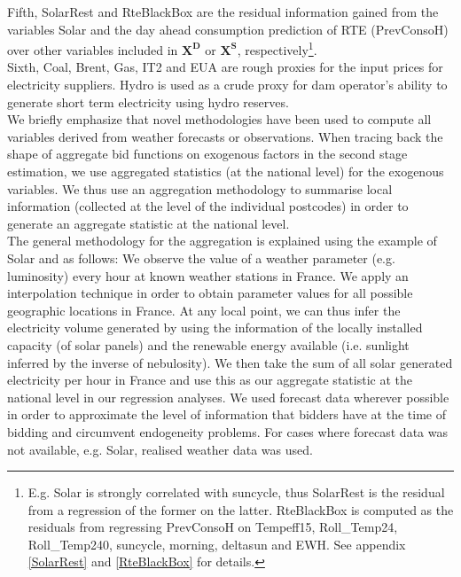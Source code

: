 Fifth, SolarRest and RteBlackBox are the residual information gained from the variables Solar and the day ahead consumption prediction of RTE (PrevConsoH) over other variables included in $\boldsymbol{X^D}$ or $\boldsymbol{X^S}$, respectively\footnote{E.g. Solar is strongly correlated with suncycle, thus SolarRest is the residual from a regression of the former on the latter. RteBlackBox is computed as the residuals from regressing PrevConsoH on Tempeff15,  Roll\_Temp24,  Roll\_Temp240, suncycle, morning, deltasun and EWH. See appendix \ref{SolarRest} and \ref{RteBlackBox} for details.}.  \\
Sixth, Coal, Brent, Gas, IT2 and EUA are rough proxies for the input prices for electricity suppliers. Hydro is used as a crude proxy for dam operator's ability to generate short term electricity using hydro reserves. \\

We briefly emphasize that novel methodologies have been used to compute all variables derived from weather forecasts or observations. 
When tracing back the shape of aggregate bid functions on exogenous factors in the second stage estimation, we use aggregated statistics (at the national level) for the exogenous variables. We thus use an aggregation methodology to summarise local information (collected at the level of the individual postcodes) in order to generate an aggregate statistic at the national level. \\

The general methodology for the aggregation is explained using the example of Solar and as follows: We observe the value of a weather parameter (e.g. luminosity) every hour at known weather stations in France. 
We apply an interpolation technique in order to obtain parameter values for all possible geographic locations in France. At any local point, we can thus infer the electricity volume generated by using the information of the locally installed capacity (of solar panels) and the renewable energy available (i.e. sunlight inferred by the inverse of nebulosity). We then take the sum of all solar generated electricity per hour in France and use this as our aggregate statistic at the national level in our regression analyses. 
We used forecast data wherever possible in order to approximate the level of information that bidders have at the time of bidding and circumvent endogeneity problems. 
For cases where forecast data was not available, e.g. Solar, realised weather data was used. 


